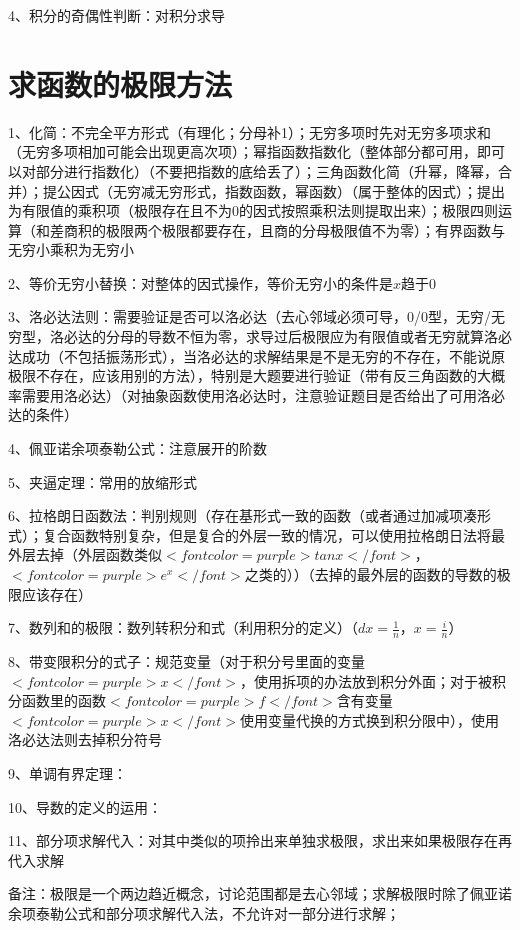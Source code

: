 4、积分的奇偶性判断：对积分求导

\section{求函数的极限方法}

1、化简：不完全平方形式（有理化；分母补1）；无穷多项时先对无穷多项求和（无穷多项相加可能会出现更高次项）；幂指函数指数化（整体部分都可用，即可以对部分进行指数化）（不要把指数的底给丢了）；三角函数化简（升幂，降幂，合并）；提公因式（无穷减无穷形式，指数函数，幂函数）（属于整体的因式）；提出为有限值的乘积项（极限存在且不为0的因式按照乘积法则提取出来）；极限四则运算（和差商积的极限两个极限都要存在，且商的分母极限值不为零）；有界函数与无穷小乘积为无穷小

2、等价无穷小替换：对整体的因式操作，等价无穷小的条件是$ x $趋于0

3、洛必达法则：需要验证是否可以洛必达（去心邻域必须可导，0/0型，无穷/无穷型，洛必达的分母的导数不恒为零，求导过后极限应为有限值或者无穷就算洛必达成功（不包括振荡形式），当洛必达的求解结果是不是无穷的不存在，不能说原极限不存在，应该用别的方法），特别是大题要进行验证（带有反三角函数的大概率需要用洛必达）（对抽象函数使用洛必达时，注意验证题目是否给出了可用洛必达的条件）

4、佩亚诺余项泰勒公式：注意展开的阶数

5、夹逼定理：常用的放缩形式

6、拉格朗日函数法：判别规则（存在基形式一致的函数（或者通过加减项凑形式）；复合函数特别复杂，但是复合的外层一致的情况，可以使用拉格朗日法将最外层去掉（外层函数类似$ <font color=purple>tanx</font> $，$ <font color=purple>e^x</font> $之类的））（去掉的最外层的函数的导数的极限应该存在）

7、数列和的极限：数列转积分和式（利用积分的定义）（$ dx=\frac{1}{n} $，$ x=\frac{i}{n} $）

8、带变限积分的式子：规范变量（对于积分号里面的变量$ <font color=purple>x</font> $，使用拆项的办法放到积分外面；对于被积分函数里的函数$ <font color=purple>f</font> $含有变量$ <font color=purple>x</font> $使用变量代换的方式换到积分限中），使用洛必达法则去掉积分符号

9、单调有界定理：

10、导数的定义的运用：

11、部分项求解代入：对其中类似的项拎出来单独求极限，求出来如果极限存在再代入求解

备注：极限是一个两边趋近概念，讨论范围都是去心邻域；求解极限时除了佩亚诺余项泰勒公式和部分项求解代入法，不允许对一部分进行求解；

